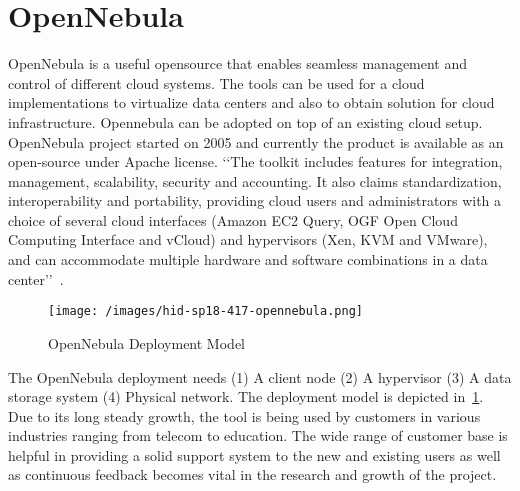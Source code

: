 
\section{OpenNebula}
OpenNebula is a useful opensource that enables seamless management and
control of different cloud systems.  The tools can be used for a cloud
implementations to virtualize data centers and also to obtain solution
for cloud infrastructure.  Opennebula can be adopted on top of an
existing cloud setup.  OpenNebula project started on 2005 and
currently the product is available as an open-source under Apache
license.
‘‘The toolkit includes features for integration, management,
scalability, security and accounting.  It also claims standardization,
interoperability and portability, providing cloud users and
administrators with a choice of several cloud interfaces (Amazon EC2
Query, OGF Open Cloud Computing Interface and vCloud) and hypervisors
(Xen, KVM and VMware), and can accommodate multiple hardware and
software combinations in a data center’’~\cite{hid-sp18-417-opennebula-wiki}.
\begin{figure}[htb]
\texttt{[image: /images/hid-sp18-417-opennebula.png]}
\caption{OpenNebula Deployment Model~\cite{hid-sp18-417-opennebula-deployment}} 
\label{F:opennebula}
\end{figure}
The OpenNebula deployment needs 
(1) A client node 
(2) A hypervisor 
(3) A data storage system 
(4) Physical network. 
The deployment model is depicted in~\ref{F:opennebula}.
Due to its long steady growth, the tool is being used by customers in
various industries ranging from telecom to education.  The wide range
of customer base is helpful in providing a solid support system to the
new and existing users as well as continuous feedback becomes vital in
the research and growth of the project.
